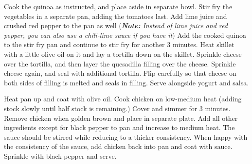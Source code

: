 \documentclass[oneside]{recipe}
\begin{document}

Cook the quinoa as instructed, and place aside in separate bowl. Stir fry the vegetables in a separate pan, adding the tomatoes last. Add lime juice and crushed red pepper to the pan as well (\textit{\textbf{Note: } Instead of lime juice and red pepper, you can also use a chili-lime sauce if you have it}) Add the cooked quinoa to the stir fry pan and continue to stir fry for another 3 minutes. Heat skillet with a little olive oil on it and lay a tortilla down on the skillet. Sprinkle cheese over the tortilla, and then layer the quesadilla filling over the cheese. Sprinkle cheese again, and seal with additional tortilla. Flip carefully so that cheese on both sides of filling is melted and seals in filling. Serve alongside yogurt and salsa. 


Heat pan up and coat with olive oil. Cook chicken on low-medium heat (adding stock slowly until half stock is remaining.) Cover and simmer for 3 minutes. Remove chicken when golden brown and place in separate plate. Add all other ingredients except for black pepper to pan and increase to medium heat. The sauce should be stirred while reducing to a thicker consistency. When happy with the consistency of the sauce, add chicken back into pan and coat with sauce. Sprinkle with black pepper and serve. 
\end{document}

